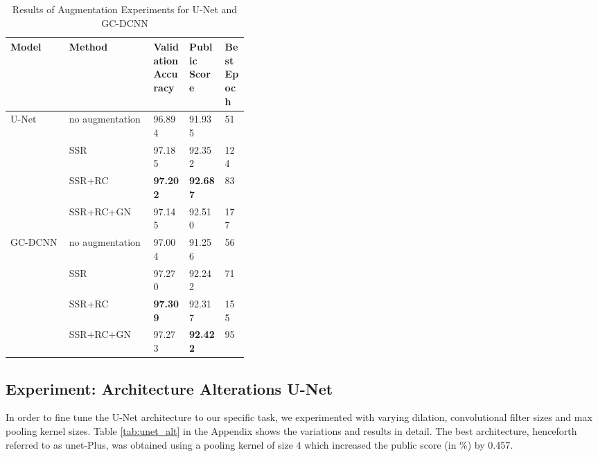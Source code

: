 \begin{table}[h!]
    \centering
    \begin{tabular}{l|l|p{0.15\linewidth}|p{0.15\linewidth}|p{0.1\linewidth}}
        Model & Method & Validation Accuracy  & Public Score & Best Epoch  \\ \hline
        U-Net & no augmentation & 96.894 & 91.935 & 51 \\ %
        &SSR & 97.185 & 92.352 & 124 \\ %
        &SSR+RC & \textbf{97.202} & \textbf{92.687} & 83 \\ %
        &SSR+RC+GN & 97.145 & 92.510 & 177  \\ %
        \hline
        GC-DCNN & no augmentation & 97.004 & 91.256 & 56 \\ %
        & SSR & 97.270 & 92.242 & 71 \\ %
        & SSR+RC & \textbf{97.309} & 92.317 & 155 \\ %
        & SSR+RC+GN & 97.273 & \textbf{92.422} & 95 \\ %
    \end{tabular}
    \caption{Results of Augmentation Experiments for U-Net and GC-DCNN}
    \label{tab:aug}
        \vspace{-5mm}
\end{table}
\subsection{Experiment: Architecture Alterations U-Net}
\label{section:unetplus}
In order to fine tune the U-Net architecture to our specific task, we experimented with varying dilation,  convolutional filter sizes and max pooling kernel sizes. 
Table \ref{tab:unet_alt} in the Appendix shows the variations and results in detail. The best architecture, henceforth referred to as \acrshort{unet}-Plus, was obtained using a pooling kernel of size 4 which increased the public score (in \%) by 0.457. 
 
